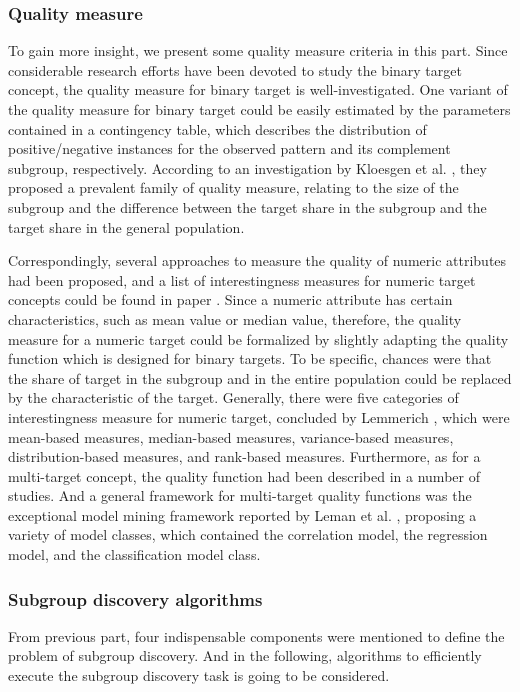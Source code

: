 \subsubsection{Quality measure}
To gain more insight, we present some quality measure criteria in this part. Since considerable research efforts have been devoted to study the binary target concept, the quality measure for binary target is well-investigated. One variant of the quality measure for binary target could be easily estimated by the parameters contained in a contingency table, which describes the distribution of positive/negative instances for the observed pattern and its complement subgroup, respectively. According to an investigation by Kloesgen et al. \cite{klosgen1996explora}, they proposed a prevalent family of quality measure, relating to the size of the subgroup and the difference between the target share in the subgroup and the target share in the general population. 

Correspondingly, several approaches to measure the quality of numeric attributes had been proposed, and a list of interestingness measures for numeric target concepts could be found in paper \cite{pieters2010subgroup}. Since a numeric attribute has certain characteristics, such as mean value or median value, therefore, the quality measure for a numeric target could be formalized by slightly adapting the quality function which is designed for binary targets. To be specific, chances were that the share of target in the subgroup and in the entire population could be replaced by the characteristic of the target. Generally, there were five categories of interestingness measure for numeric target, concluded by Lemmerich \cite{lemmerich2014novel}, which were mean-based measures, median-based measures, variance-based measures, distribution-based measures, and rank-based measures. 
Furthermore, as for a multi-target concept, the quality function had been described in a number of studies. And a general framework for multi-target quality functions was the exceptional model mining framework reported by Leman et al. \cite{leman2008exceptional}, proposing a variety of model classes, which contained the correlation model, the regression model, and the classification model class.   

\subsubsection{Subgroup discovery algorithms}
From previous part, four indispensable components were mentioned to define the problem of subgroup discovery. And in the following, algorithms to efficiently execute the subgroup discovery task is going to be considered. 

